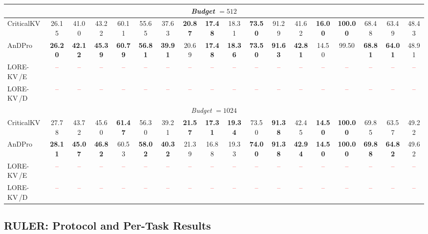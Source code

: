 \documentclass{article} %
\newcommand{\best}[1]{\textcolor{bestblue}{\textbf{#1}}}
\newcommand{\second}[1]{\textcolor{secondorange}{#1}}
\newcommand{\tbd}{\textcolor{red}{--}}
\newcommand{\lorekvE}{LORE-KV\,/E}
\newcommand{\lorekvD}{LORE-KV\,/D}
\begin{document}
\begin{table}[t]
{\begin{tabular}{lccccccccccccccccc}
\midrule
\multicolumn{18}{c}{\textit{Budget} $=512$} \\
\midrule
CriticalKV & \second{26.15} & \second{41.00} & \second{43.22} & \second{60.11} & \second{55.65} & \second{37.63} & \best{20.87} & \best{17.48} & \second{18.31} & \best{73.50} & \second{91.29} & \second{41.62} & \best{16.00} & \best{100.00} & \second{68.48} & \second{63.49} & 48.43 \\
AnDPro & \best{26.20} & \best{42.12} & \best{45.39} & \best{60.79} & \best{56.81} & \best{39.91} & \second{20.69} & \best{17.48} & \best{18.36} & \best{73.50} & \best{91.63} & \best{42.81} & \second{14.50} & \second{99.50} & \best{68.81} & \best{64.01} & 48.91 \\
\lorekvE & \tbd & \tbd & \tbd & \tbd & \tbd & \tbd & \tbd & \tbd & \tbd & \tbd & \tbd & \tbd & \tbd & \tbd & \tbd & \tbd & \tbd \\
\lorekvD & \tbd & \tbd & \tbd & \tbd & \tbd & \tbd & \tbd & \tbd & \tbd & \tbd & \tbd & \tbd & \tbd & \tbd & \tbd & \tbd & \tbd \\

\midrule
\multicolumn{18}{c}{\textit{Budget} $=1024$} \\
\midrule
CriticalKV & \second{27.78} & \second{43.72} & \second{45.60} & \best{61.47} & \second{56.30} & \second{39.21} & \best{21.57} & \best{17.31} & \best{19.34} & \second{73.50} & \best{91.38} & \second{42.45} & \best{14.50} & \best{100.00} & \second{69.85} & \second{63.57} & 49.22 \\
AnDPro & \best{28.11} & \best{45.07} & \best{46.82} & \second{60.53} & \best{58.02} & \best{40.32} & \second{21.39} & \second{16.88} & \second{19.33} & \best{74.00} & \best{91.38} & \best{42.94} & \best{14.50} & \best{100.00} & \best{69.88} & \best{64.82} & 49.62 \\
\lorekvE & \tbd & \tbd & \tbd & \tbd & \tbd & \tbd & \tbd & \tbd & \tbd & \tbd & \tbd & \tbd & \tbd & \tbd & \tbd & \tbd & \tbd \\
\lorekvD & \tbd & \tbd & \tbd & \tbd & \tbd & \tbd & \tbd & \tbd & \tbd & \tbd & \tbd & \tbd & \tbd & \tbd & \tbd & \tbd & \tbd \\
\bottomrule
\end{tabular}}
\end{table}


\subsection{RULER: Protocol and Per-Task Results}
\label{app:ruler_results}
\end{document}
